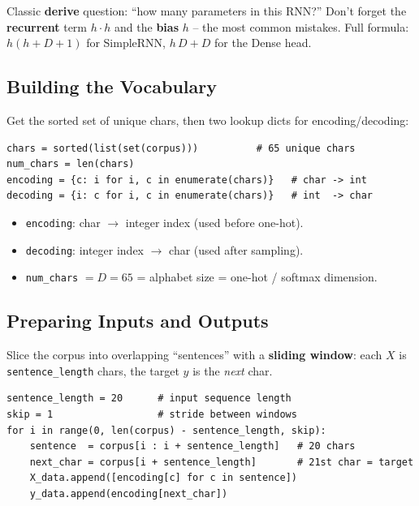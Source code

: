\documentclass[10pt,a4paper]{article}
\begin{document}
	\begin{examtipbox}
		Classic \textbf{derive} question: ``how many parameters in this RNN?'' Don't forget the \textbf{recurrent} term $h\cdot h$ and the \textbf{bias} $h$ -- the most common mistakes. Full formula: $h(h+D+1)$ for SimpleRNN, $h\,D+D$ for the Dense head.
	\end{examtipbox}

	\subsection{Building the Vocabulary}

	Get the sorted set of unique chars, then two lookup dicts for encoding/decoding:

	\begin{verbatim}
chars = sorted(list(set(corpus)))          # 65 unique chars
num_chars = len(chars)
encoding = {c: i for i, c in enumerate(chars)}   # char -> int
decoding = {i: c for i, c in enumerate(chars)}   # int  -> char
	\end{verbatim}

	\begin{itemize}[leftmargin=*]
		\item \texttt{encoding}: char $\rightarrow$ integer index (used before one-hot).
		\item \texttt{decoding}: integer index $\rightarrow$ char (used after sampling).
		\item \texttt{num\_chars} $= D = 65$ = alphabet size = one-hot / softmax dimension.
	\end{itemize}

	\subsection{Preparing Inputs and Outputs}

	Slice the corpus into overlapping ``sentences'' with a \textbf{sliding window}: each $X$ is \texttt{sentence\_length} chars, the target $y$ is the \emph{next} char.

	\begin{verbatim}
sentence_length = 20      # input sequence length
skip = 1                  # stride between windows
for i in range(0, len(corpus) - sentence_length, skip):
    sentence  = corpus[i : i + sentence_length]   # 20 chars
    next_char = corpus[i + sentence_length]       # 21st char = target
    X_data.append([encoding[c] for c in sentence])
    y_data.append(encoding[next_char])
	\end{verbatim}
\end{document}

